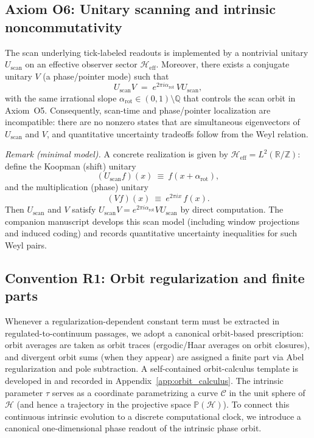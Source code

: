 \subsection{Axiom O6: Unitary scanning and intrinsic noncommutativity}
\begin{axiom}
The scan underlying tick-labeled readouts is implemented by a nontrivial unitary $U_{\mathrm{scan}}$ on an effective observer sector $\mathcal{H}_{\mathrm{eff}}$. Moreover, there exists a conjugate unitary $V$ (a phase/pointer mode) such that
\begin{equation}
    U_{\mathrm{scan}}V \;=\; e^{2\pi i \alpha_{\mathrm{rot}}}\,VU_{\mathrm{scan}},
\end{equation}
with the same irrational slope $\alpha_{\mathrm{rot}}\in(0,1)\setminus\mathbb{Q}$ that controls the scan orbit in Axiom~O5. Consequently, scan-time and phase/pointer localization are incompatible: there are no nonzero states that are simultaneous eigenvectors of $U_{\mathrm{scan}}$ and $V$, and quantitative uncertainty tradeoffs follow from the Weyl relation.
\end{axiom}
\noindent\textit{Remark (minimal model).} A concrete realization is given by $\mathcal{H}_{\mathrm{eff}}=L^2(\mathbb{R}/\mathbb{Z})$: define the Koopman (shift) unitary
\begin{equation}
    (U_{\mathrm{scan}}f)(x)\ \equiv\ f(x+\alpha_{\mathrm{rot}}),
\end{equation}
and the multiplication (phase) unitary
\begin{equation}
    (Vf)(x)\ \equiv\ e^{2\pi i x}\,f(x).
\end{equation}
Then $U_{\mathrm{scan}}$ and $V$ satisfy $U_{\mathrm{scan}}V=e^{2\pi i \alpha_{\mathrm{rot}}}VU_{\mathrm{scan}}$ by direct computation. The companion manuscript \cite{Ma2025HPA} develops this scan model (including window projections and induced coding) and records quantitative uncertainty inequalities for such Weyl pairs.

\subsection{Convention R1: Orbit regularization and finite parts}
\label{conv:orbit_regularization}
Whenever a regularization-dependent constant term must be extracted in regulated-to-continuum passages, we adopt a canonical orbit-based prescription: orbit averages are taken as orbit traces (ergodic/Haar averages on orbit closures), and divergent orbit sums (when they appear) are assigned a finite part via Abel regularization and pole subtraction. A self-contained orbit-calculus template is developed in \cite{Ma2025HPA} and recorded in Appendix~\ref{app:orbit_calculus}.
The intrinsic parameter $\tau$ serves as a coordinate parametrizing a curve $\mathcal{C}$ in the unit sphere of $\mathcal{H}$ (and hence a trajectory in the projective space $\mathbb{P}(\mathcal{H})$). To connect this continuous intrinsic evolution to a discrete computational clock, we introduce a canonical one-dimensional phase readout of the intrinsic phase orbit.

